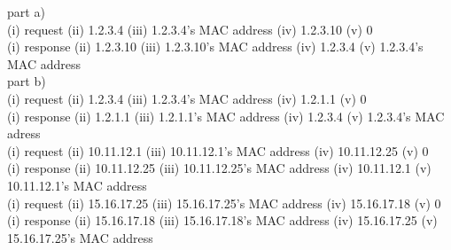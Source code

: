 \documentclass[12pt]{article}
\begin{document}
\begin{enumerate}
        part a) \\
        (i) request (ii) 1.2.3.4 (iii) 1.2.3.4's MAC address (iv) 1.2.3.10 (v) 0 \\
        (i) response (ii) 1.2.3.10 (iii) 1.2.3.10's MAC address (iv) 1.2.3.4 (v) 1.2.3.4's MAC address \\

        part b) \\
        (i) request (ii) 1.2.3.4 (iii) 1.2.3.4's MAC address (iv) 1.2.1.1 (v) 0 \\
        (i) response (ii) 1.2.1.1 (iii) 1.2.1.1's MAC address (iv) 1.2.3.4 (v) 1.2.3.4's MAC adress \\
        (i) request (ii) 10.11.12.1 (iii) 10.11.12.1's MAC address (iv) 10.11.12.25 (v) 0 \\
        (i) response (ii) 10.11.12.25 (iii) 10.11.12.25's MAC address (iv) 10.11.12.1 (v) 10.11.12.1's MAC address \\
        (i) request (ii) 15.16.17.25 (iii) 15.16.17.25's MAC address (iv) 15.16.17.18 (v) 0 \\
        (i) response (ii) 15.16.17.18 (iii) 15.16.17.18's MAC address (iv) 15.16.17.25 (v) 15.16.17.25's MAC address \\

\end{enumerate}
\end{document}
